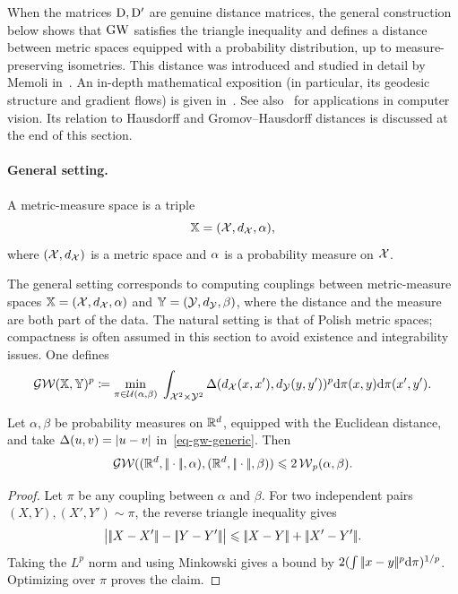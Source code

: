When the matrices $\mathrm{D},\mathrm{D}'$ are genuine distance matrices, the general construction below shows that $\operatorname{\mathrm{GW}}$ satisfies the triangle inequality and defines a distance between metric spaces equipped with a probability distribution, up to measure-preserving isometries.
%
This distance was introduced and studied in detail by Memoli in~\cite{memoli-2011}. An in-depth mathematical exposition (in particular, its geodesic structure and gradient flows) is given in~\cite{SturmGW}. See also~\cite{schmitzer2013modelling} for applications in computer vision.
%
Its relation to Hausdorff and Gromov--Hausdorff distances is discussed at the end of this section.

\paragraph{General setting.}

\begin{defn}\label{def-metric-measure-space}
	A metric-measure space is a triple
	\[
		\mathbb{X}=(\mathcal{X},d_{\mathcal{X}},\alpha),
	\]
	where $(\mathcal{X},d_{\mathcal{X}})$ is a metric space and $\alpha$ is a probability measure on $\mathcal{X}$.
\end{defn}
The general setting corresponds to computing couplings between metric-measure spaces $\mathbb{X}=(\mathcal{X},d_{\mathcal{X}},\alpha)$ and $\mathbb{Y}=(\mathcal{Y},d_{\mathcal{Y}},\beta)$, where the distance and the measure are both part of the data.
%
The natural setting is that of Polish metric spaces; compactness is often assumed in this section to avoid existence and integrability issues.
%
One defines
	\begin{align}
		\label{eq-gw-generic}
		\operatorname{\mathcal{GW}}( \mathbb{X},\mathbb{Y} )^p \coloneqq
		\underset{ \pi \in \mathcal{U}(\alpha,\beta) }{\min}\;
		\int_{\mathcal{X}^2 \times \mathcal{Y}^2}
		 \Delta(d_{\mathcal{X}}(x,x'),d_{\mathcal{Y}}(y,y'))^p
		\mathrm{d}\pi(x,y)\mathrm{d}\pi(x',y').
	\end{align}

\begin{prop}\label{prop-gw-controlled-by-wasserstein}
	Let $\alpha,\beta$ be probability measures on $\mathbb{R}^d$, equipped with the Euclidean distance, and take $\Delta(u,v)=|u-v|$ in~\eqref{eq-gw-generic}. Then
	\[
		\operatorname{\mathcal{GW}}((\mathbb{R}^d,|\!| \cdot |\!|,\alpha),(\mathbb{R}^d,|\!| \cdot |\!|,\beta))
		\leqslant
		2\operatorname{\mathcal{W}}_p(\alpha,\beta).
	\]
\end{prop}
\begin{proof}
	Let $\pi$ be any coupling between $\alpha$ and $\beta$. For two independent pairs $(X,Y),(X',Y')\sim\pi$, the reverse triangle inequality gives
	\[
		\big|\norm{X-X'}-\norm{Y-Y'}\big|
		\leq
		\norm{X-Y}+\norm{X'-Y'}.
	\]
	Taking the $L^p$ norm and using Minkowski gives a bound by $2(\int|\!| x-y |\!|^p\mathrm{d}\pi)^{1/p}$. Optimizing over $\pi$ proves the claim.
\end{proof}

